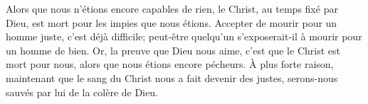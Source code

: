 Alors que nous n’étions encore capables de rien,
	le Christ, au temps fixé par Dieu,
	est mort pour les impies que nous étions.
Accepter de mourir pour un homme juste, c’est déjà difficile;
	peut-être quelqu’un s’exposerait-il à mourir pour un homme de bien.
Or, la preuve que Dieu nous aime, c’est que le Christ est mort pour nous,
	alors que nous étions encore pécheurs.
À plus forte raison,
	maintenant que le sang du Christ nous a fait devenir des justes,
	serons-nous sauvés par lui de la colère de Dieu.
